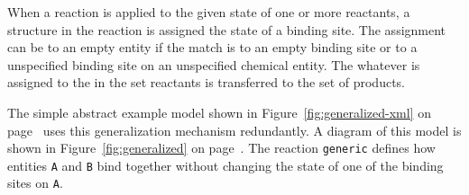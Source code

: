 \documentclass{cekarticle}
\begin{document}
When a reaction is applied to the given state of one or more reactants, a  structure
in the reaction is assigned the state of a binding site.  The assignment can be to
an empty entity if the match is to an empty binding site or to a unspecified binding site on
an unspecified chemical entity.  The whatever is assigned to the 
in the set reactants is transferred to the set of products.

The simple abstract example model shown in
Figure~\ref{fig:generalized-xml} on
page~\pageref{fig:generalized-xml} uses this generalization
mechanism redundantly. A diagram of this model is shown in
Figure~\ref{fig:generalized} on page~\pageref{fig:generalized}.
The reaction \texttt{generic} defines how entities \texttt{A} and
\texttt{B} bind together without changing the state of one of the
binding sites on \texttt{A}.
\end{document}
